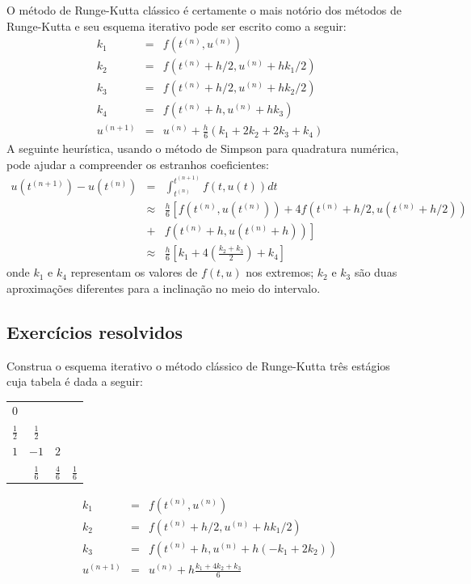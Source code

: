 O método de Runge-Kutta clássico é certamente o mais notório dos métodos de Runge-Kutta e seu esquema iterativo pode ser escrito como a seguir:
\begin{eqnarray}
k_1&=&f\left(t^{(n)},u^{(n)}\right)\\
k_2&=&f\left(t^{(n)}+h/2,u^{(n)}+hk_1/2\right)\\
k_3&=&f\left(t^{(n)}+h/2,u^{(n)}+hk_2/2\right)\\
k_4&=&f\left(t^{(n)}+h,u^{(n)}+hk_3\right)\\
u^{(n+1)}&=&u^{(n)}+\frac{h}{6}\left(k_1+2k_2+2k_3+k_4\right)
\end{eqnarray}
A seguinte heurística, usando o método de Simpson para quadratura numérica, pode ajudar a compreender os estranhos coeficientes:
\begin{eqnarray}
u({t^{(n+1)}})-u({t^{(n)}})&=&\int_{t^{(n)}}^{t^{(n+1)}}f(t,u(t))dt \\
&\approx& \frac{h}{6}\left[ f\left(t^{(n)},u(t^{(n)})\right)+4f\left(t^{(n)}+h/2,u(t^{(n)}+h/2)\right)\right.\\
&+&\left.f\left(t^{(n)}+h,u(t^{(n)}+h)\right)\right]\\
&\approx& \frac{h}{6}\left[k_1+4\left(\frac{k_2+k_3}{2}\right)+k_4\right]
\end{eqnarray}
onde $k_1$ e $k_4$ representam os valores de $f(t,u)$ nos extremos; $k_2$ e $k_3$ são duas aproximações diferentes para a inclinação no meio do intervalo.

\subsection*{Exercícios resolvidos}
\begin{exeresol}\label{exeresol:problema_resolvido_RK3} Construa o esquema iterativo o método clássico de Runge-Kutta três estágios cuja tabela é dada a seguir:

\begin{tabular}{c|ccc}
  $0$           &               &               & \\
  $\frac{1}{2}$ & $\frac{1}{2}$ &               & \\
  $1$           & $-1$          & $2$           & \\  \hline
                & $\frac{1}{6}$ & $\frac{4}{6}$ & $\frac{1}{6}$
\end{tabular}

\end{exeresol}
\begin{resol}
 \begin{eqnarray}
    k_1&=&f\left(t^{(n)},u^{(n)}\right)\\
    k_2&=&f\left(t^{(n)}+h/2,u^{(n)}+hk_1/2\right)\\
    k_3&=&f\left(t^{(n)}+h,u^{(n)}+h(-k_1+2k_2)\right)\\
  u^{(n+1)}&=&u^{(n)}+h\frac{k_1+4k_2+k_3}{6}
 \end{eqnarray}
\end{resol}

